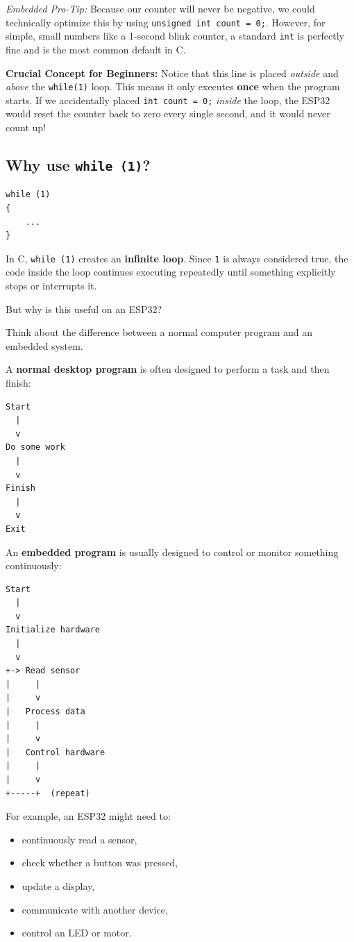 \documentclass[11pt]{article}
\begin{document}
\emph{Embedded Pro-Tip:} Because our counter will never be negative, we could technically optimize this by using \texttt{unsigned int count = 0;}. However, for simple, small numbers like a 1-second blink counter, a standard \texttt{int} is perfectly fine and is the most common default in C.

\textbf{Crucial Concept for Beginners:} Notice that this line is placed \emph{outside} and \emph{above} the \texttt{while(1)} loop. This means it only executes \textbf{once} when the program starts. If we accidentally placed \texttt{int count = 0;} \emph{inside} the loop, the ESP32 would reset the counter back to zero every single second, and it would never count up!
\subsection*{Why use \texttt{while (1)}?}

\begin{verbatim}
while (1)
{
    ...
}
\end{verbatim}

In C, \texttt{while (1)} creates an \textbf{infinite loop}. Since \texttt{1} is always considered true, the code inside the loop continues executing repeatedly until something explicitly stops or interrupts it.

But why is this useful on an ESP32?

Think about the difference between a normal computer program and an embedded system.

A \textbf{normal desktop program} is often designed to perform a task and then finish:

\begin{verbatim}
Start
  |
  v
Do some work
  |
  v
Finish
  |
  v
Exit
\end{verbatim}

An \textbf{embedded program} is usually designed to control or monitor something continuously:

\begin{verbatim}
Start
  |
  v
Initialize hardware
  |
  v
+-> Read sensor
|     |
|     v
|   Process data
|     |
|     v
|   Control hardware
|     |
|     v
+-----+  (repeat)
\end{verbatim}

For example, an ESP32 might need to:

\begin{itemize}
    \item continuously read a sensor,
    \item check whether a button was pressed,
    \item update a display,
    \item communicate with another device,
    \item control an LED or motor.
\end{itemize}
\end{document}
